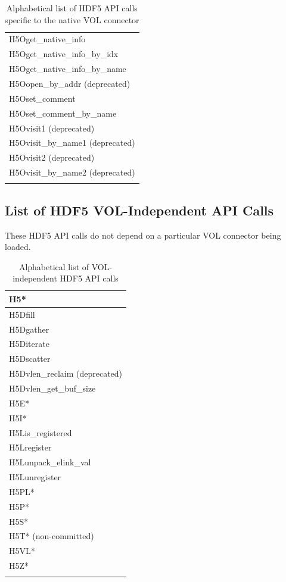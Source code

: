 \begin{longtable}{ |>{\raggedright\arraybackslash}p{\linewidth}| }
    H5Oget\_native\_info \\
    H5Oget\_native\_info\_by\_idx \\
    H5Oget\_native\_info\_by\_name \\
    H5Oopen\_by\_addr (deprecated) \\
    H5Oset\_comment \\
    H5Oset\_comment\_by\_name \\
    H5Ovisit1 (deprecated) \\
    H5Ovisit\_by\_name1 (deprecated) \\
    H5Ovisit2 (deprecated) \\
    H5Ovisit\_by\_name2 (deprecated) \\
    \hline
\caption{Alphabetical list of HDF5 API calls specific to the native VOL connector}
\end{longtable}

\subsection{List of HDF5 VOL-Independent API Calls}

These HDF5 API calls do not depend on a particular VOL connector being loaded.

\begin{longtable}{ |>{\raggedright\arraybackslash}p{\linewidth}| }
    \hline
    H5* \\
    \hline
    H5Dfill \\
    H5Dgather \\
    H5Diterate \\
    H5Dscatter \\
    H5Dvlen\_reclaim (deprecated) \\
    H5Dvlen\_get\_buf\_size \\
    \hline
    H5E* \\
    H5I* \\
    \hline
    H5Lis\_registered \\
    H5Lregister \\
    H5Lunpack\_elink\_val \\
    H5Lunregister \\
    \hline
    H5PL* \\
    H5P* \\
    H5S* \\
    H5T* (non-committed) \\
    H5VL* \\
    H5Z* \\
    \hline
\caption{Alphabetical list of VOL-independent HDF5 API calls}
\end{longtable}


